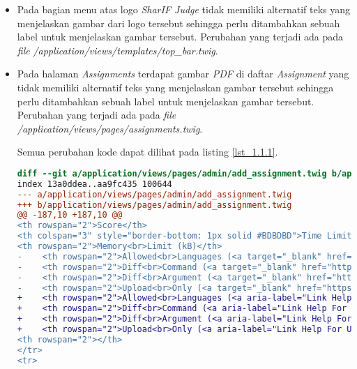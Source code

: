 \begin{itemize}
	\item Pada bagian menu atas logo \textit{SharIF Judge} tidak memiliki alternatif teks yang menjelaskan gambar dari logo tersebut sehingga perlu ditambahkan sebuah label untuk menjelaskan gambar tersebut. Perubahan yang terjadi ada pada \textit{file} \textit{/application/views/templates/top\_bar.twig}.

	\item Pada halaman \textit{Assignments} terdapat gambar \textit{PDF} di daftar \textit{Assignment} yang tidak memiliki alternatif teks yang menjelaskan gambar tersebut sehingga perlu ditambahkan sebuah label untuk menjelaskan gambar tersebut. Perubahan yang terjadi ada pada \textit{file} \textit{/application/views/pages/assignments.twig}.
	
	Semua perubahan kode dapat dilihat pada listing \ref{lst_1.1.1}.
	
\begin{lstlisting}[language=diff, caption=Perubahan untuk mematuhi kriteria 1.1.1, label=lst_1.1.1, basicstyle=\ttfamily, frame=single,
columns=fullflexible, keepspaces=true, breaklines=true]
diff --git a/application/views/pages/admin/add_assignment.twig b/application/views/pages/admin/add_assignment.twig
index 13a0ddea..aa9fc435 100644
--- a/application/views/pages/admin/add_assignment.twig
+++ b/application/views/pages/admin/add_assignment.twig
@@ -187,10 +187,10 @@
<th rowspan="2">Score</th>
<th colspan="3" style="border-bottom: 1px solid #BDBDBD">Time Limit (ms)</th>
<th rowspan="2">Memory<br>Limit (kB)</th>
-    <th rowspan="2">Allowed<br>Languages (<a target="_blank" href="https://github.com/ifunpar/Sharif-Judge/blob/docs/v1.4/add_assignment.md#allowed-languages">?</a>)</th>
-    <th rowspan="2">Diff<br>Command (<a target="_blank" href="https://github.com/ifunpar/Sharif-Judge/blob/docs/v1.4/add_assignment.md#diff-command">?</a>)</th>
-    <th rowspan="2">Diff<br>Argument (<a target="_blank" href="https://github.com/ifunpar/Sharif-Judge/blob/docs/v1.4/add_assignment.md#diff-arguments">?</a>)</th>
-    <th rowspan="2">Upload<br>Only (<a target="_blank" href="https://github.com/ifunpar/Sharif-Judge/blob/docs/v1.4/add_assignment.md#upload-only">?</a>)</th>
+    <th rowspan="2">Allowed<br>Languages (<a aria-label="Link Help For Languages" target="_blank" href="https://github.com/ifunpar/Sharif-Judge/blob/docs/v1.4/add_assignment.md#allowed-languages">?</a>)</th>
+    <th rowspan="2">Diff<br>Command (<a aria-label="Link Help For Diff Command" target="_blank" href="https://github.com/ifunpar/Sharif-Judge/blob/docs/v1.4/add_assignment.md#diff-command">?</a>)</th>
+    <th rowspan="2">Diff<br>Argument (<a aria-label="Link Help For Diff Argument" target="_blank" href="https://github.com/ifunpar/Sharif-Judge/blob/docs/v1.4/add_assignment.md#diff-arguments">?</a>)</th>
+    <th rowspan="2">Upload<br>Only (<a aria-label="Link Help For Upload Only" target="_blank" href="https://github.com/ifunpar/Sharif-Judge/blob/docs/v1.4/add_assignment.md#upload-only">?</a>)</th>
<th rowspan="2"></th>
</tr>
<tr>


\end{lstlisting}
\end{itemize}
